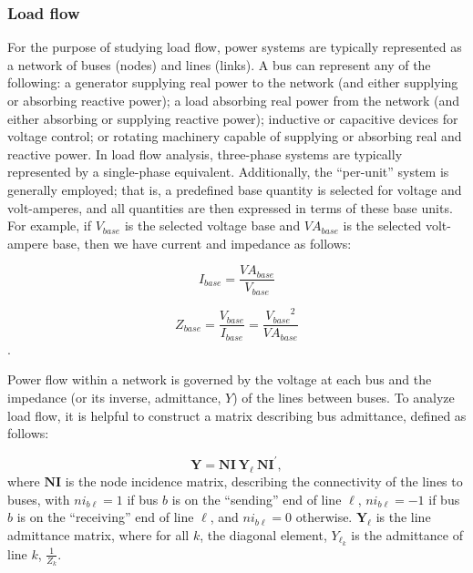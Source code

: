 
\subsubsection{Load flow}
For the purpose of studying load flow, power systems are typically represented as a network of buses (nodes) and lines (links).  A bus can represent any of the following:  a generator supplying real power to the network (and either supplying or absorbing reactive power); a load absorbing real power from the network (and either absorbing or supplying reactive power); inductive or capacitive devices for voltage control; or rotating machinery capable of supplying or absorbing real and reactive power.  In load flow analysis, three-phase systems are typically represented by a single-phase equivalent.  Additionally, the “per-unit” system is generally employed; that is, a predefined base quantity is selected for voltage and volt-amperes, and all quantities are then expressed in terms of these base units.  For example, if $V_{base}$ is the selected voltage base and $VA_{base}$ is the selected volt-ampere base, then we have current and impedance as follows:

\begin{equation}
I_{base} = \frac{VA_{base}}{V_{base}}
\end{equation}

\begin{equation}
Z_{base} = \frac{V_{base}}{I_{base}} = \frac{{V_{base}}^2}{VA_{base}}
\end{equation}.

Power flow within a network is governed by the voltage at each bus and the impedance (or its inverse, admittance, $Y$) of the lines between buses.  To analyze load flow, it is helpful to construct a matrix describing bus admittance, defined as follows:

\begin{equation}
\mathbf{Y} = \mathbf{NI \ Y_\ell \ NI^{\prime}}, 
\end{equation}
%	
where $\mathbf{NI}$ is the node incidence matrix, describing the connectivity of the lines to buses, with $ni_{b\ell }= 1$ if bus $b$ is on the “sending” end of line $\ell$, $ni_{b\ell }= -1$ if bus $b$ is on the “receiving” end of line $\ell$, and $ni_{b\ell }= 0$ otherwise.  $\mathbf{Y_\ell}$ is the line admittance matrix, where for all $k$, the diagonal element, $Y_{\ell_k}$ is the admittance of line $k$, $\frac{1}{Z_k}$.

